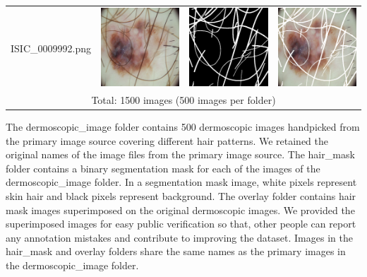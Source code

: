 \begin{table}[tbh!]
{\begin{tabular}{cccc}
			\begin{sideways}\;\;\;\;\;ISIC\_0009992.png\end{sideways} & \includegraphics[width=.33\textwidth ,keepaspectratio]{images/ongoing/derm/ISIC_0009992.png}                   &     \includegraphics[width=.33\textwidth ,keepaspectratio]{images/ongoing/mask/ISIC_0009992.png}        &     \includegraphics[width=.33\textwidth ,keepaspectratio]{images/ongoing/overlay/ISIC_0009992.png}      \\
			\cmidrule(lr){1-4} 
			\multicolumn{4}{c}{Total: 1500 images (500
				images per folder)}                               \\
			\bottomrule
		\end{tabular}
	}
\end{table}
The dermoscopic\_image folder contains 500 dermoscopic images handpicked from the primary image source covering different hair patterns. We retained the original names of the image files from the primary image source. The hair\_mask folder contains a binary segmentation mask for each of the images of the dermoscopic\_image folder. In a segmentation mask image, white pixels represent skin hair and black pixels represent background. The overlay folder contains hair mask images superimposed on the original dermoscopic images. We provided the superimposed images for easy public verification so that, other people can report any annotation mistakes and contribute to improving the dataset. Images in the hair\_mask and overlay folders share the same names as the primary images in the dermoscopic\_image folder.


